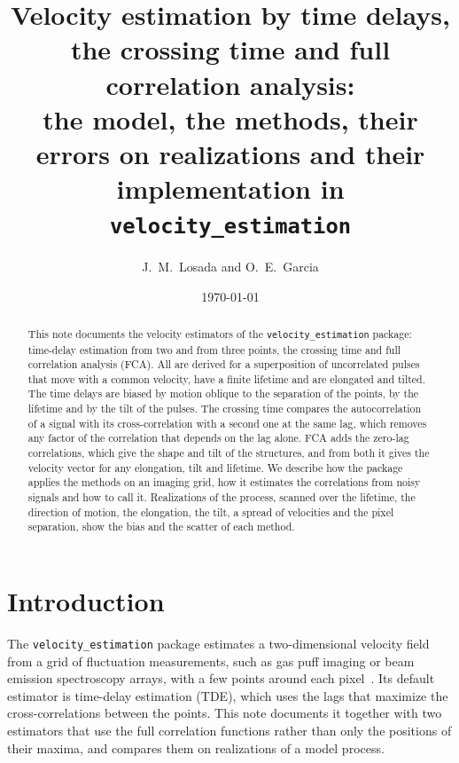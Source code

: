 \documentclass[aps,pre,11pt,a4paper,preprint,amsmath,amssymb,groupedaddress]{revtex4-2}
\newcommand{\code}[1]{\texttt{#1}}
\begin{document}
\title{Velocity estimation by time delays, the crossing time and full correlation analysis:\\
the model, the methods, their errors on realizations and their implementation in \code{velocity\_estimation}}

\author{J.~M.~Losada and O.~E.~Garcia}

\date{\today}

\begin{abstract}
This note documents the velocity estimators of the \code{velocity\_estimation} package: time-delay estimation from two and from three points, the crossing time and full correlation analysis (FCA). All are derived for a superposition of uncorrelated pulses that move with a common velocity, have a finite lifetime and are elongated and tilted. The time delays are biased by motion oblique to the separation of the points, by the lifetime and by the tilt of the pulses. The crossing time compares the autocorrelation of a signal with its cross-correlation with a second one at the same lag, which removes any factor of the correlation that depends on the lag alone. FCA adds the zero-lag correlations, which give the shape and tilt of the structures, and from both it gives the velocity vector for any elongation, tilt and lifetime. We describe how the package applies the methods on an imaging grid, how it estimates the correlations from noisy signals and how to call it. Realizations of the process, scanned over the lifetime, the direction of motion, the elongation, the tilt, a spread of velocities and the pixel separation, show the bias and the scatter of each method.
\end{abstract}

\maketitle

\section{Introduction}
\label{sec:introduction}

The \code{velocity\_estimation} package estimates a two-dimensional velocity field from a grid of fluctuation measurements, such as gas puff imaging or beam emission spectroscopy arrays, with a few points around each pixel~\cite{losada_three-point_2024}. Its default estimator is time-delay estimation (TDE), which uses the lags that maximize the cross-correlations between the points. This note documents it together with two estimators that use the full correlation functions rather than only the positions of their maxima, and compares them on realizations of a model process.
\end{document}
